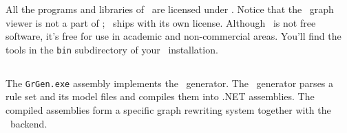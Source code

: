 All the programs and libraries of \GrG\ are licensed under . 
Notice that the \yComp\ graph viewer is not a part of \GrG ; \yComp\ ships with its own license. 
Although \yComp\ is not free software, it's free for use in academic and non-commercial areas.
You'll find the tools in the \texttt{bin} subdirectory of your \GrG\ installation.

\pagebreak

\subsection{\texttt{}}

\noindent The \texttt{GrGen.exe} assembly implements the \GrG\ generator. 
The \GrG\ generator parses a rule set and its model files and compiles them into .NET assemblies.
The compiled assemblies form a specific graph rewriting system together with the \GrG\ backend.


